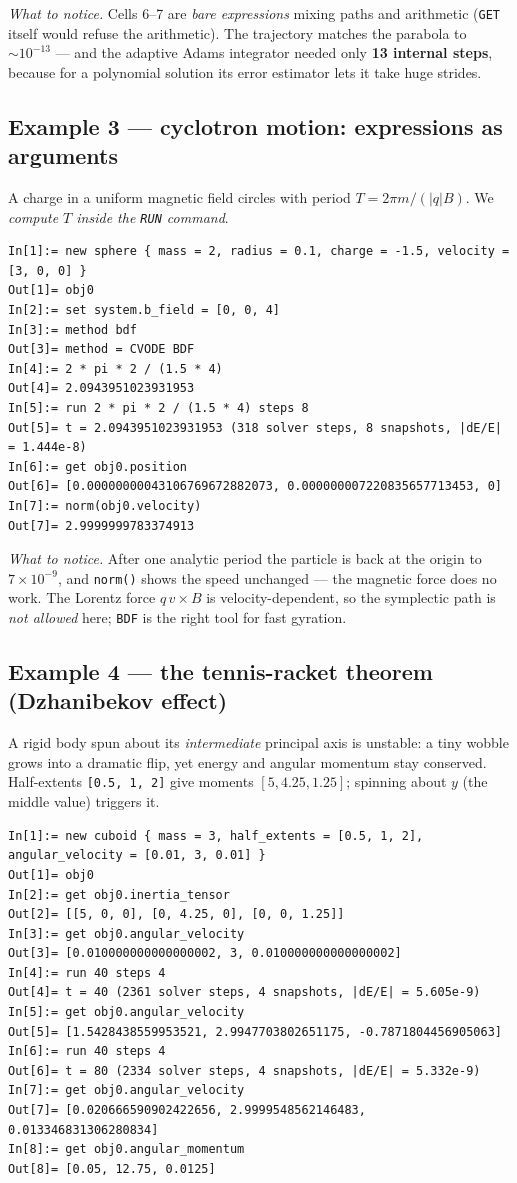 \documentclass[11pt]{article}
\newcommand{\kw}[1]{\texttt{\uppercase{#1}}}
\newcommand{\code}[1]{\texttt{#1}}
\begin{document}
\emph{What to notice.} Cells 6--7 are \emph{bare expressions} mixing
paths and arithmetic (\kw{get} itself would refuse the arithmetic). The
trajectory matches the parabola to $\sim\!10^{-13}$ --- and the adaptive
Adams integrator needed only \textbf{13 internal steps}, because for a
polynomial solution its error estimator lets it take huge strides.

\subsection{Example 3 --- cyclotron motion: expressions as arguments}

A charge in a uniform magnetic field circles with period
$T = 2\pi m/(|q|B)$. We \emph{compute $T$ inside the \kw{run} command}.

\begin{lstlisting}
In[1]:= new sphere { mass = 2, radius = 0.1, charge = -1.5, velocity = [3, 0, 0] }
Out[1]= obj0
In[2]:= set system.b_field = [0, 0, 4]
In[3]:= method bdf
Out[3]= method = CVODE BDF
In[4]:= 2 * pi * 2 / (1.5 * 4)
Out[4]= 2.0943951023931953
In[5]:= run 2 * pi * 2 / (1.5 * 4) steps 8
Out[5]= t = 2.0943951023931953 (318 solver steps, 8 snapshots, |dE/E| = 1.444e-8)
In[6]:= get obj0.position
Out[6]= [0.00000000043106769672882073, 0.000000007220835657713453, 0]
In[7]:= norm(obj0.velocity)
Out[7]= 2.9999999783374913
\end{lstlisting}

\emph{What to notice.} After one analytic period the particle is back at
the origin to $7\times10^{-9}$, and \code{norm()} shows the speed
unchanged --- the magnetic force does no work. The Lorentz force
$q\,v\times B$ is velocity-dependent, so the symplectic path is
\emph{not allowed} here; \kw{bdf} is the right tool for fast gyration.

\subsection{Example 4 --- the tennis-racket theorem (Dzhanibekov effect)}

A rigid body spun about its \emph{intermediate} principal axis is
unstable: a tiny wobble grows into a dramatic flip, yet energy and
angular momentum stay conserved. Half-extents \code{[0.5, 1, 2]} give
moments $[5, 4.25, 1.25]$; spinning about $y$ (the middle value)
triggers it.

\begin{lstlisting}
In[1]:= new cuboid { mass = 3, half_extents = [0.5, 1, 2], angular_velocity = [0.01, 3, 0.01] }
Out[1]= obj0
In[2]:= get obj0.inertia_tensor
Out[2]= [[5, 0, 0], [0, 4.25, 0], [0, 0, 1.25]]
In[3]:= get obj0.angular_velocity
Out[3]= [0.010000000000000002, 3, 0.010000000000000002]
In[4]:= run 40 steps 4
Out[4]= t = 40 (2361 solver steps, 4 snapshots, |dE/E| = 5.605e-9)
In[5]:= get obj0.angular_velocity
Out[5]= [1.5428438559953521, 2.9947703802651175, -0.7871804456905063]
In[6]:= run 40 steps 4
Out[6]= t = 80 (2334 solver steps, 4 snapshots, |dE/E| = 5.332e-9)
In[7]:= get obj0.angular_velocity
Out[7]= [0.020666590902422656, 2.9999548562146483, 0.013346831306280834]
In[8]:= get obj0.angular_momentum
Out[8]= [0.05, 12.75, 0.0125]
\end{lstlisting}
\end{document}
